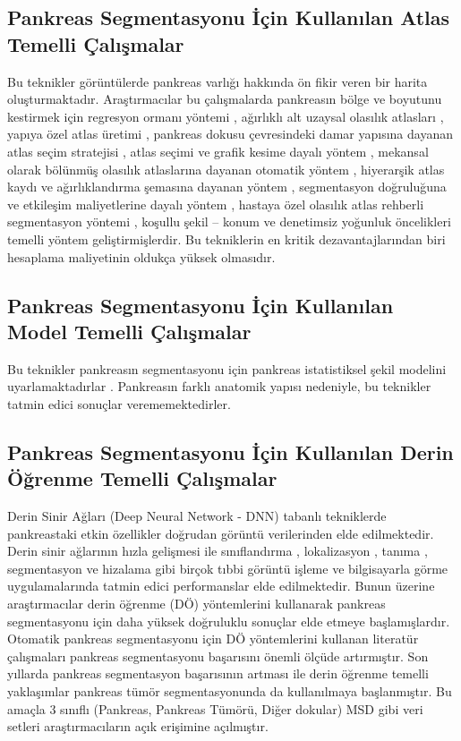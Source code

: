 \subsection{Pankreas Segmentasyonu İçin Kullanılan Atlas Temelli Çalışmalar}
Bu teknikler görüntülerde pankreas varlığı hakkında ön fikir veren bir harita oluşturmaktadır. Araştırmacılar bu çalışmalarda pankreasın bölge ve boyutunu kestirmek için regresyon ormanı yöntemi \cite{oda2016regression}, ağırlıklı alt uzaysal olasılık atlasları \cite{karasawa2015pancreas}, yapıya özel atlas üretimi \cite{karasawa2015pancreas},  pankreas dokusu çevresindeki damar yapısına dayanan atlas seçim stratejisi \cite{karasawa2017multi}, atlas seçimi ve grafik kesime dayalı yöntem \cite{oda2011organ}, mekansal olarak bölünmüş olasılık atlaslarına dayanan otomatik yöntem \cite{chu2013multi}, hiyerarşik atlas kaydı ve ağırlıklandırma şemasına dayanan yöntem \cite{wolz2013automated}, segmentasyon doğruluğuna ve etkileşim maliyetlerine dayalı yöntem \cite{takizawa2017interactive}, hastaya özel olasılık atlas rehberli segmentasyon yöntemi \cite{shimizu2010automated}, koşullu şekil -- konum ve denetimsiz yoğunluk öncelikleri temelli yöntem \cite{okada2015abdominal} geliştirmişlerdir. Bu tekniklerin en kritik dezavantajlarından biri hesaplama maliyetinin oldukça yüksek olmasıdır.

\subsection{Pankreas Segmentasyonu İçin Kullanılan Model Temelli Çalışmalar}
Bu teknikler pankreasın segmentasyonu için pankreas istatistiksel şekil modelini uyarlamaktadırlar \cite{hammon2013model}.  Pankreasın farklı anatomik yapısı nedeniyle, bu teknikler tatmin edici sonuçlar verememektedirler.

\subsection{Pankreas Segmentasyonu İçin Kullanılan Derin Öğrenme Temelli Çalışmalar}
Derin Sinir Ağları (Deep Neural Network - DNN) tabanlı tekniklerde pankreastaki etkin özellikler doğrudan görüntü verilerinden elde edilmektedir. Derin sinir ağlarının hızla gelişmesi ile sınıflandırma \cite{roth2015deep,roth2015deeporgan}, lokalizasyon \cite{roth2016spatial,roth2018spatial}, tanıma \cite{zhou2016pancreas,cai2017improving}, segmentasyon \cite{yu2018recurrent,ma2018novel,zhu20183d} ve hizalama \cite{roth2015deeporgan,chen2019harnessing} gibi birçok tıbbi görüntü işleme ve bilgisayarla görme uygulamalarında tatmin edici performanslar elde edilmektedir. Bunun üzerine araştırmacılar derin öğrenme (DÖ) yöntemlerini kullanarak pankreas segmentasyonu için daha yüksek doğruluklu sonuçlar elde etmeye başlamışlardır. Otomatik pankreas segmentasyonu için DÖ yöntemlerini kullanan literatür çalışmaları pankreas segmentasyonu başarısını önemli ölçüde artırmıştır. Son yıllarda pankreas segmentasyon başarısının artması ile derin öğrenme temelli yaklaşımlar pankreas tümör segmentasyonunda da kullanılmaya başlanmıştır. Bu amaçla 3 sınıflı (Pankreas, Pankreas Tümörü, Diğer dokular) MSD gibi veri setleri araştırmacıların açık erişimine açılmıştır.

